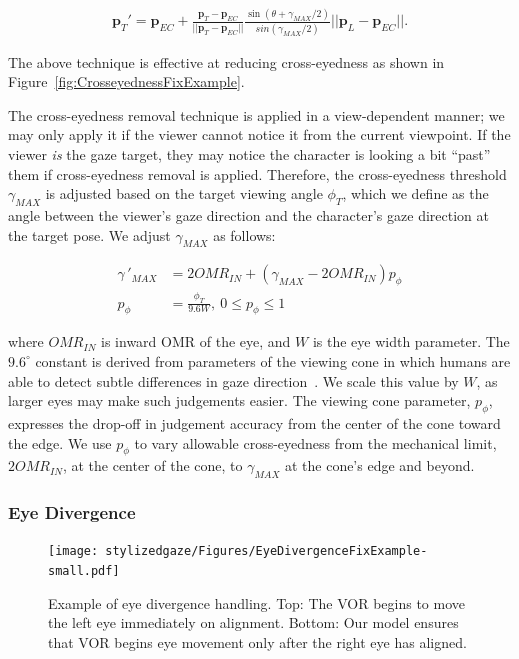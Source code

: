 \begin{align}
\mathbf{p}_T' = \mathbf{p}_{EC} + \frac{\mathbf{p}_T - \mathbf{p}_{EC}}{||\mathbf{p}_T - \mathbf{p}_{EC}||} \frac{\sin(\theta + \gamma_{MAX}/2)}{sin(\gamma_{MAX}/2)}||\mathbf{p}_L - \mathbf{p}_{EC}||.
\end{align}

The above technique is effective at reducing cross-eyedness as shown in Figure~\ref{fig:CrosseyednessFixExample}.

The cross-eyedness removal technique is applied in a view-dependent manner; we may only apply it if the viewer cannot notice it from the current viewpoint.
If the viewer \emph{is} the gaze target, they may notice the character is looking a bit ``past'' them if cross-eyedness removal is applied.
Therefore, the cross-eyedness threshold $\gamma_{MAX}$ is adjusted based on the target viewing angle $\phi_T$, which we define as the angle between the viewer's gaze direction and the character's gaze direction at the target pose. We adjust $\gamma_{MAX}$ as follows:

\begin{align}
\label{eq:CrosseyednessFix}
\gamma\,'_{MAX} &= 2 OMR_{IN} + (\gamma_{MAX} - 2 OMR_{IN}) p_{\phi} \\
p_{\phi} &= \frac{\phi_T}{9.6W},~ 0 \le p_{\phi} \le 1 \nonumber
\end{align}

where $OMR_{IN}$ is inward OMR of the eye, and $W$ is the eye width parameter. The $9.6^{\circ}$ constant is derived from parameters of the viewing cone in which humans are able to detect subtle differences in gaze direction~\cite{argyle1976gaze}. We scale this value by $W$, as larger eyes may make such judgements easier. The viewing cone parameter, $p_{\phi}$, expresses the drop-off in judgement accuracy from the center of the cone toward the edge. We use $p_{\phi}$ to vary allowable cross-eyedness from the mechanical limit, $2 OMR_{IN}$, at the center of the cone, to $\gamma_{MAX}$ at the cone's edge and beyond.

\subsubsection{Eye Divergence}

\begin{figure}
\centering
\texttt{[image: stylizedgaze/Figures/EyeDivergenceFixExample-small.pdf]}
\caption{Example of eye divergence handling. Top: The VOR begins to move the left eye immediately on alignment. Bottom: Our model ensures that VOR begins eye movement only after the right eye has aligned.}
\label{fig:EyeDivergenceFixExample}
\end{figure}

